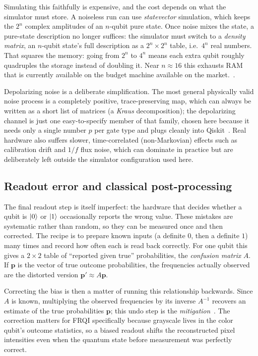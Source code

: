 Simulating this faithfully is expensive, and the cost depends on what the simulator must store. A noiseless run can use \emph{statevector} simulation, which keeps the $2^n$ complex amplitudes of an $n$-qubit pure state. Once noise mixes the state, a pure-state description no longer suffices: the simulator must switch to a \emph{density matrix}, an $n$-qubit state's full description as a $2^n\times 2^n$ table, i.e.\ $4^n$ real numbers. That squares the memory: going from $2^n$ to $4^n$ means each extra qubit roughly quadruples the storage instead of doubling it. Near $n\approx 16$ this exhausts RAM that is currently available on the budget machine available on the market.~\cite{NielsenChuang2010}.

Depolarizing noise is a deliberate simplification. The most general physically valid noise process is a completely positive, trace-preserving map, which can always be written as a short list of matrices (a \emph{Kraus} decomposition); the depolarizing channel is just one easy-to-specify member of that family, chosen here because it needs only a single number $p$ per gate type and plugs cleanly into Qiskit~\cite{NielsenChuang2010}. Real hardware also suffers slower, time-correlated (non-Markovian) effects such as calibration drift and $1/f$ flux noise, which can dominate in practice but are deliberately left outside the simulator configuration used here.

\subsection{Readout error and classical post-processing}
The final readout step is itself imperfect: the hardware that decides whether a qubit is $\ket{0}$ or $\ket{1}$ occasionally reports the wrong value. These mistakes are systematic rather than random, so they can be measured once and then corrected. The recipe is to prepare known inputs (a definite $0$, then a definite $1$) many times and record how often each is read back correctly. For one qubit this gives a $2\times 2$ table of ``reported given true'' probabilities, the \emph{confusion matrix} $A$. If $\mathbf{p}$ is the vector of true outcome probabilities, the frequencies actually observed are the distorted version $\mathbf{p}'\approx A\mathbf{p}$.

Correcting the bias is then a matter of running this relationship backwards. Since $A$ is known, multiplying the observed frequencies by its inverse $A^{-1}$ recovers an estimate of the true probabilities $\mathbf{p}$; this undo step is the \emph{mitigation}~\cite{Mu2025GuidedImageFiltering}. The correction matters for FRQI specifically because grayscale lives in the color qubit's outcome statistics, so a biased readout shifts the reconstructed pixel intensities even when the quantum state before measurement was perfectly correct.

